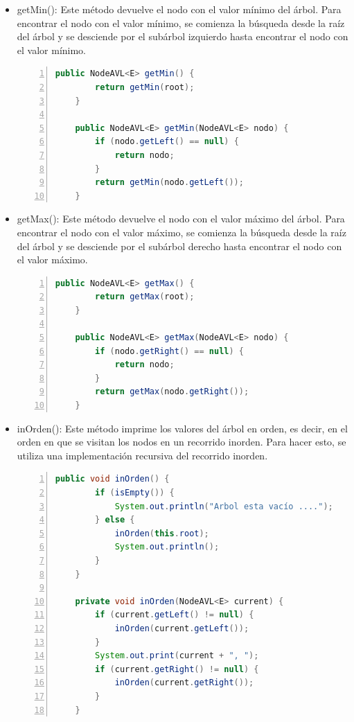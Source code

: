 \documentclass{article}
\begin{document}
\begin{itemize}
\begin{lstlisting}[language=Java, caption=Método remove(E x), numbers=left]
    }
                            \end{lstlisting}
                    \item getMin(): Este método devuelve el nodo con el valor mínimo del árbol. Para encontrar el nodo con el valor mínimo, se comienza la búsqueda desde la raíz del árbol y se desciende por el subárbol izquierdo hasta encontrar el nodo con el valor mínimo.
                            \begin{lstlisting}[language=Java, caption=Método getMin(), numbers=left]
    public NodeAVL<E> getMin() {
        return getMin(root);
    }
    
    public NodeAVL<E> getMin(NodeAVL<E> nodo) {
        if (nodo.getLeft() == null) {
            return nodo;
        }
        return getMin(nodo.getLeft());
    }
                            \end{lstlisting}
                    \item getMax(): Este método devuelve el nodo con el valor máximo del árbol. Para encontrar el nodo con el valor máximo, se comienza la búsqueda desde la raíz del árbol y se desciende por el subárbol derecho hasta encontrar el nodo con el valor máximo.
                            \begin{lstlisting}[language=Java, caption=Método getMax(), numbers=left]
    public NodeAVL<E> getMax() {
        return getMax(root);
    }
    
    public NodeAVL<E> getMax(NodeAVL<E> nodo) {
        if (nodo.getRight() == null) {
            return nodo;
        }
        return getMax(nodo.getRight());
    }
                            \end{lstlisting}
                    \item inOrden(): Este método imprime los valores del árbol en orden, es decir, en el orden en que se visitan los nodos en un recorrido inorden. Para hacer esto, se utiliza una implementación recursiva del recorrido inorden.
                            \begin{lstlisting}[language=Java, caption=Método inOrden(), numbers=left]
    public void inOrden() {
        if (isEmpty()) {
            System.out.println("Arbol esta vacío ....");
        } else {
            inOrden(this.root);
            System.out.println();
        }
    }
    
    private void inOrden(NodeAVL<E> current) {
        if (current.getLeft() != null) {
            inOrden(current.getLeft());
        }
        System.out.print(current + ", ");
        if (current.getRight() != null) {
            inOrden(current.getRight());
        }
    }
                            \end{lstlisting}
                \end{itemize}
        \clearpage  
\end{document}
